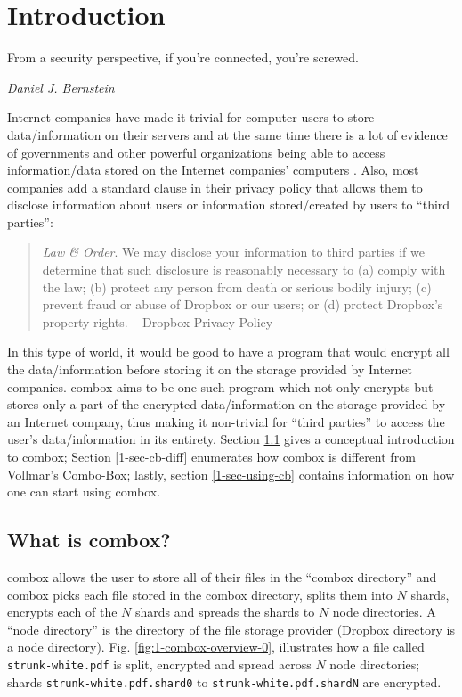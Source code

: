 \chapter{Introduction}

\epigraph{From a security perspective, if you're connected, you're
  screwed.}{\textit{Daniel J. Bernstein}}

Internet companies have made it trivial for computer users to store
data/information on their servers and at the same time there is a lot
of evidence of governments and other powerful organizations being able
to access information/data stored on the Internet companies' computers
\cite{website:wikileaks-spyfiles}. Also, most companies add a standard
clause in their privacy policy that allows them to disclose
information about users or information stored/created by users to
``third parties'':

\begin{quote}
  \emph{Law \& Order}. We may disclose your information to third
  parties if we determine that such disclosure is reasonably necessary
  to (a) comply with the law; (b) protect any person from death or
  serious bodily injury; (c) prevent fraud or abuse of Dropbox or our
  users; or (d) protect Dropbox's property rights. -- Dropbox Privacy
  Policy \cite{website:dropbox-privacy}
\end{quote}

In this type of world, it would be good to have a program that would
encrypt all the data/information before storing it on the storage
provided by Internet companies. combox aims to be one such program
which not only encrypts but stores only a part of the encrypted
data/information on the storage provided by an Internet company, thus
making it non-trivial for ``third parties'' to access the user's
data/information in its entirety. Section \ref{1-sec-cb} gives a
conceptual introduction to combox; Section \ref{1-sec-cb-diff}
enumerates how combox is different from Vollmar's Combo-Box; lastly,
section \ref{1-sec-using-cb} contains information on how one can start
using combox.

\section{What is combox?}\label{1-sec-cb}

combox allows the user to store all of their files in the ``combox
directory'' and combox picks each file stored in the combox directory,
splits them into $N$ shards, encrypts each of the $N$ shards and
spreads the shards to $N$ node directories. A ``node directory'' is
the directory of the file storage provider (Dropbox directory is a
node directory). Fig. \ref{fig:1-combox-overview-0}, illustrates how a
file called \verb+strunk-white.pdf+ is split, encrypted and spread
across $N$ node directories; shards \verb+strunk-white.pdf.shard0+ to
\verb+strunk-white.pdf.shardN+ are encrypted.

